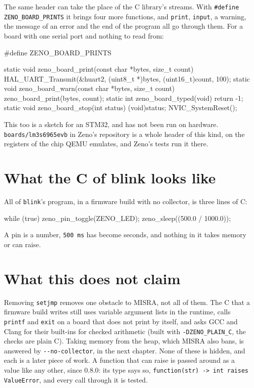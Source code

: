 The same header can take the place of the C library's streams. With
\verb|#define ZENO_BOARD_PRINTS| it brings four more functions, and
\verb|print|, \verb|input|, a warning, the message of an error and the
end of the program all go through them. For a board with one serial
port and nothing to read from:

\begin{zenofrag}[lang=shell]
#define ZENO_BOARD_PRINTS

static void zeno_board_print(const char *bytes, size_t count) {
    HAL_UART_Transmit(&huart2, (uint8_t *)bytes, (uint16_t)count, 100);
}
static void zeno_board_warn(const char *bytes, size_t count) {
    zeno_board_print(bytes, count);
}
static int zeno_board_typed(void) { return -1; }
static void zeno_board_stop(int status) {
    (void)status;
    NVIC_SystemReset();
}
\end{zenofrag}

This too is a sketch for an STM32, and has not been run on hardware.
\verb|boards/lm3s6965evb| in Zeno's repository is a whole header of
this kind, on the registers of the chip QEMU emulates, and Zeno's
tests run it there.

\section{What the C of blink looks like}

All of \verb|blink|'s program, in a firmware build with no collector,
is three lines of C:

\begin{zenofrag}[lang=shell]
while (true) {
    zeno_pin_toggle(ZENO_LED);
    zeno_sleep((500.0 / 1000.0));
}
\end{zenofrag}

A pin is a number, \verb|500 ms| has become seconds, and nothing in it
takes memory or can raise.

\section{What this does not claim}

Removing \verb|setjmp| removes one obstacle to MISRA, not all of them.
The C that a firmware build writes still uses variable
argument lists in the runtime, calls \verb|printf| and \verb|exit| on
a board that does not print by itself, and
asks GCC and Clang for their built-ins for checked arithmetic (built
with \verb|-DZENO_PLAIN_C|, the checks are plain C). Taking memory from
the heap, which MISRA also bans, is answered by \verb|--no-collector|,
in the next chapter. None of these is hidden, and each is a later piece
of work. A function that can raise is passed around as a value like
any other, since 0.8.0: its type says so,
\verb|function(str) -> int raises ValueError|, and every call through
it is tested.

